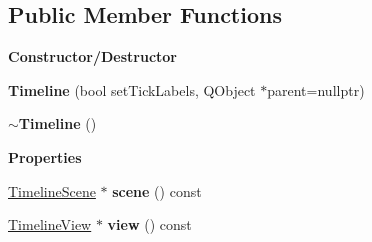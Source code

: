 \subsection*{Public Member Functions}
\begin{Indent}\textbf{ Constructor/\+Destructor}\par
\begin{DoxyCompactItemize}
\item 
\mbox{\label{classrev_1_1_view_1_1_timeline_ab2afadb3286a9e4578906fd08459cf06}} 
{\bfseries Timeline} (bool set\+Tick\+Labels, Q\+Object $\ast$parent=nullptr)
\item 
\mbox{\label{classrev_1_1_view_1_1_timeline_abcace8b99ba030d0b810636d612ed6de}} 
{\bfseries $\sim$\+Timeline} ()
\end{DoxyCompactItemize}
\end{Indent}
\begin{Indent}\textbf{ Properties}\par
\begin{DoxyCompactItemize}
\item 
\mbox{\label{classrev_1_1_view_1_1_timeline_a900577233264ff96cde4d06631e537b5}} 
\mbox{\hyperlink{classrev_1_1_view_1_1_timeline_scene}{Timeline\+Scene}} $\ast$ {\bfseries scene} () const
\item 
\mbox{\label{classrev_1_1_view_1_1_timeline_a799aabed771789fc6e5fda58e0610b02}} 
\mbox{\hyperlink{classrev_1_1_view_1_1_timeline_view}{Timeline\+View}} $\ast$ {\bfseries view} () const
\end{DoxyCompactItemize}
\end{Indent}
